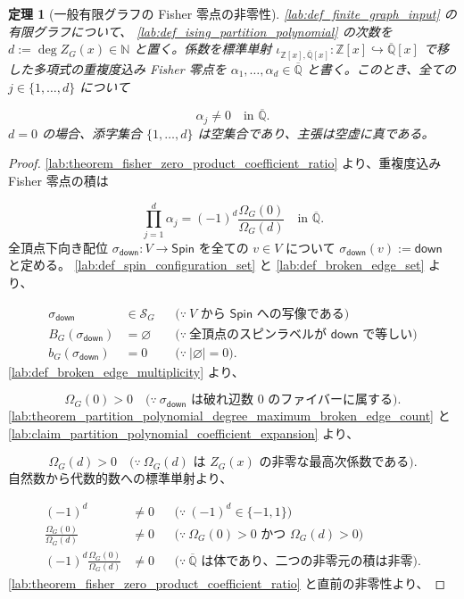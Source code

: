 \documentclass[11pt,a4paper]{article}
\newtheorem{theorem}[definition]{定理}
\theoremstyle{remark}
\begin{document}
\begin{theorem}[一般有限グラフの Fisher 零点の非零性]\label{lab:theorem_fisher_zeros_nonzero}
\cref{lab:def_finite_graph_input}
 の有限グラフについて、
\cref{lab:def_ising_partition_polynomial}
 の次数を 
$d:=\deg Z_G(x)\in\mathbb N$
 と置く。係数を標準単射 
$\iota_{\mathbb Z[x],\overline{\mathbb Q}[x]}:\mathbb Z[x]\hookrightarrow\overline{\mathbb Q}[x]$
 で移した多項式の重複度込み Fisher 零点を
$\alpha_1,\ldots,\alpha_d\in\overline{\mathbb Q}$
 と書く。このとき、全ての 
$j\in\{1,\ldots,d\}$
 について

\[\alpha_j\ne0\quad\text{in }\overline{\mathbb Q}.\]
$d=0$
 の場合、添字集合 
$\{1,\ldots,d\}$
 は空集合であり、主張は空虚に真である。

\end{theorem}
\begin{proof}
\cref{lab:theorem_fisher_zero_product_coefficient_ratio}
 より、重複度込み Fisher 零点の積は

\[\prod_{j=1}^{d}\alpha_j
=
(-1)^d\frac{\Omega_G(0)}{\Omega_G(d)}
\quad\text{in }\overline{\mathbb Q}.\]
全頂点下向き配位 
$\sigma_{\mathsf{down}}:V\to\mathsf{Spin}$
 を全ての 
$v\in V$
 について 
$\sigma_{\mathsf{down}}(v):=\mathsf{down}$
 と定める。
\cref{lab:def_spin_configuration_set}
 と 
\cref{lab:def_broken_edge_set}
 より、

\[\begin{aligned}
\sigma_{\mathsf{down}}
&\in\mathcal S_G
&&\bigl(\because\ V\text{ から }\mathsf{Spin}\text{ への写像である}\bigr)\\
B_G(\sigma_{\mathsf{down}})
&=\varnothing
&&\bigl(\because\ \text{全頂点のスピンラベルが }\mathsf{down}\text{ で等しい}\bigr)\\
b_G(\sigma_{\mathsf{down}})
&=0
&&\bigl(\because\ |\varnothing|=0\bigr).
\end{aligned}\]
\cref{lab:def_broken_edge_multiplicity}
 より、

\[\Omega_G(0)>0
\quad\bigl(\because\ \sigma_{\mathsf{down}}\text{ は破れ辺数 }0\text{ のファイバーに属する}\bigr).\]
\cref{lab:theorem_partition_polynomial_degree_maximum_broken_edge_count}
 と 
\cref{lab:claim_partition_polynomial_coefficient_expansion}
 より、

\[\Omega_G(d)>0
\quad\bigl(\because\ \Omega_G(d)\text{ は }Z_G(x)\text{ の非零な最高次係数である}\bigr).\]
自然数から代数的数への標準単射より、

\[\begin{aligned}
(-1)^d
&\ne0
&&\bigl(\because\ (-1)^d\in\{-1,1\}\bigr)\\
\frac{\Omega_G(0)}{\Omega_G(d)}
&\ne0
&&\bigl(\because\ \Omega_G(0)>0\text{ かつ }\Omega_G(d)>0\bigr)\\
(-1)^d\frac{\Omega_G(0)}{\Omega_G(d)}
&\ne0
&&\bigl(\because\ \overline{\mathbb Q}\text{ は体であり、二つの非零元の積は非零}\bigr).
\end{aligned}\]
\cref{lab:theorem_fisher_zero_product_coefficient_ratio}
 と直前の非零性より、


\end{proof}
\end{document}
